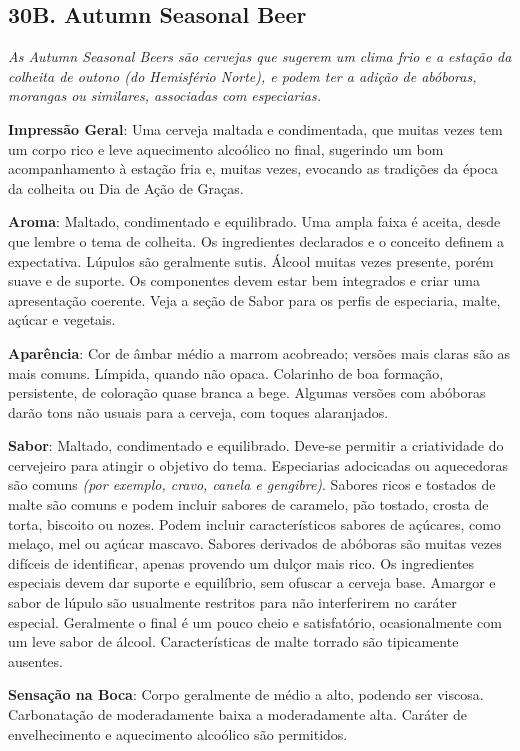 \subsection*{30B. Autumn Seasonal Beer}
\textit{As Autumn Seasonal Beers são cervejas que sugerem um clima frio e a estação da colheita de outono (do Hemisfério Norte), e podem ter a adição de abóboras, morangas ou similares, associadas com especiarias.}

\textbf{Impressão Geral}: Uma cerveja maltada e condimentada, que muitas vezes tem um corpo rico e leve aquecimento alcoólico no final, sugerindo um bom acompanhamento à estação fria e, muitas vezes, evocando as tradições da época da colheita ou Dia de Ação de Graças.

\textbf{Aroma}: Maltado, condimentado e equilibrado. Uma ampla faixa é aceita, desde que lembre o tema de colheita. Os ingredientes declarados e o conceito definem a expectativa. Lúpulos são geralmente sutis. Álcool muitas vezes presente, porém suave e de suporte. Os componentes devem estar bem integrados e criar uma apresentação coerente. Veja a seção de Sabor para os perfis de especiaria, malte, açúcar e vegetais.

\textbf{Aparência}: Cor de âmbar médio a marrom acobreado; versões mais claras são as mais comuns. Límpida, quando não opaca. Colarinho de boa formação, persistente, de coloração quase branca a bege. Algumas versões com abóboras darão tons não usuais para a cerveja, com toques alaranjados.

\textbf{Sabor}: Maltado, condimentado e equilibrado. Deve-se permitir a criatividade do cervejeiro para atingir o objetivo do tema. Especiarias adocicadas ou aquecedoras são comuns \textit{(por exemplo, cravo, canela e gengibre)}. Sabores ricos e tostados de malte são comuns e podem incluir sabores de caramelo, pão tostado, crosta de torta, biscoito ou nozes. Podem incluir característicos sabores de açúcares, como melaço, mel ou açúcar mascavo. Sabores derivados de abóboras são muitas vezes difíceis de identificar, apenas provendo um dulçor mais rico. Os ingredientes especiais devem dar suporte e equilíbrio, sem ofuscar a cerveja base. Amargor e sabor de lúpulo são usualmente restritos para não interferirem no caráter especial. Geralmente o final é um pouco cheio e satisfatório, ocasionalmente com um leve sabor de álcool. Características de malte torrado são tipicamente ausentes.

\textbf{Sensação na Boca}: Corpo geralmente de médio a alto, podendo ser viscosa. Carbonatação de moderadamente baixa a moderadamente alta. Caráter de envelhecimento e aquecimento alcoólico são permitidos.

